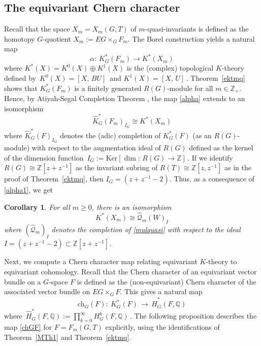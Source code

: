 \documentclass[11pt]{amsart}
\newtheorem{cor}[theorem]{Corollary}
\theoremstyle{definition}
\theoremstyle{remark}
\numberwithin{equation}{section}
\newcommand{\la}{\label}
\newcommand{\Ker}{\mathrm{Ker}}
\newcommand{\ch}{\mathrm{ch}}
\def\cQ{\mathcal{Q}}
\def\Z{\mathbb{Z}}
\def\Q{\mathbb{Q}}
\begin{document}
\subsection{The equivariant Chern character} 
Recall that the space $ X_m = X_m(G,T) $ of $m$-quasi-invariants is defined as the homotopy $G$-quotient $ X_m := EG \times _G F_m $. The Borel construction yields a natural map
%
\begin{equation}\la{alpha}
\alpha: \, K_G^*(F_m) \to K^*(X_m)
\end{equation}
%
where $ K^*(X) = K^0(X) \oplus K^1(X) $ is the (complex) topological $K$-theory defined by
$\,K^0(X) = [X, \,BU]\,$ and $ K^1(X) = [X,\,U]\,$. Theorem~\ref{ektmq} shows that 
$K_G^*(F_m)$ is a finitely generated $R(G)$-module for all $ m \in \Z_+ $. Hence, by Atiyah-Segal 
Completion Theorem \cite{AS69}, the map \eqref{alpha} extends to an isomorphism
%
\begin{equation}\la{alpha1}
\widehat{K}_G^*(F_m)_{I_G} \cong K^*(X_m)
\end{equation}
%
where $ \widehat{K}_G^*(F)_{I_G}  $ denotes the (adic) completion of $ K_G^*(F) $ (as an $R(G)$-module) with respect to the augmentation ideal of $ R(G) $ defined as the kernel of the dimension function $\, I_G := \Ker[\dim:\, R(G) \to \Z]\,$. 
If we identify $ R(G) \cong \Z[z + z^{-1}] $ as the invariant subring of $R(T) \cong \Z[z,z^{-1}] $ as in the proof of
Theorem~\ref{ektmq}, then $ I_G = (z + z^{-1} - 2) $. Thus, as a consequence of \eqref{alpha1}, we get
%
\begin{cor}
\la{Cor111}
For all $ m \ge 0 $, there is an isomorphism
$$ 
K^*(X_m) \cong \widehat{\cQ}_m(W)_I 
$$ 
where $ (\widehat{\cQ}_m)_I $ denotes the completion of \eqref{mulquasi} with respect to the ideal $ I = (z + z^{-1} - 2) \subset \Z[z+z^{-1}]$.
\end{cor}
%

Next, we compute a Chern character map relating
equivariant $K$-theory to equivariant cohomology.
Recall that the Chern character of an equivariant vector bundle on
a $G$-space $F$ is defined as the (non-equivariant) Chern character of the associated vector bundle on $ EG \times_G F $. This gives a natural map
%
\begin{equation}
\la{chGF}
\ch_G(F):\ K^*_G(F) \,\to\, \widehat{H}^{\ast}_G(F, \Q)
\end{equation}
%
where $\,\widehat{H}^{\ast}_G(F, \Q) := \prod_{k=0}^\infty H^k_G(F, \Q)\,$. The following proposition describes the map \eqref{chGF} for $ F = F_m(G,T) $ explicitly, using the identifications of Theorem~\ref{MTh1} and Theorem~\ref{ektmq}.
\end{document}
